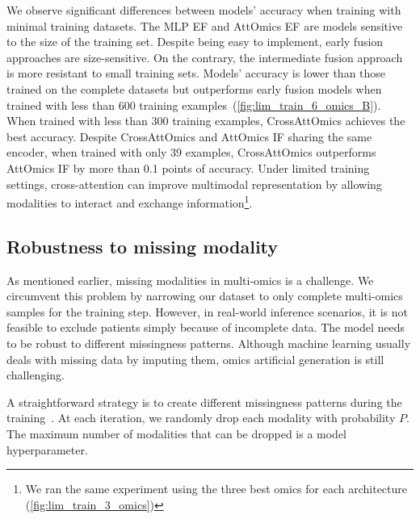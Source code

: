 \documentclass[../main.tex]{subfiles}
\begin{document}
	    We observe significant differences between models' accuracy when training with minimal training datasets.
	    The MLP EF and AttOmics EF are models sensitive to the size of the training set.
	    Despite being easy to implement, early fusion approaches are size-sensitive.
	    On the contrary, the intermediate fusion approach is more resistant to small training sets.
	    Models' accuracy is lower than those trained on the complete datasets but outperforms early fusion models when trained with less than 600 training examples~(\cref{fig:lim_train_6_omics_B}).
	    When trained with less than 300 training examples, CrossAttOmics achieves the best accuracy.
	    Despite CrossAttOmics and AttOmics IF sharing the same encoder, when trained with only 39 examples, CrossAttOmics outperforms AttOmics IF by more than 0.1 points of accuracy.
	    Under limited training settings, cross-attention can improve multimodal representation by allowing modalities to interact and exchange information\footnote{We ran the same experiment using the three best omics for each architecture (\cref{fig:lim_train_3_omics})}.

	\subsection{Robustness to missing modality}
	    As mentioned earlier, missing modalities in multi-omics is a challenge.
	    We circumvent this problem by narrowing our dataset to only complete multi-omics samples for the training step.
	    However, in real-world inference scenarios, it is not feasible to exclude patients simply because of incomplete data.
	    The model needs to be robust to different missingness patterns.
	    Although machine learning usually deals with missing data by imputing them, omics artificial generation is still challenging.

	    A straightforward strategy is to create different missingness patterns during the training~\cite{Cheerla2019}.
	    At each iteration, we randomly drop each modality with probability \(P\).
	    The maximum number of modalities that can be dropped is a model hyperparameter.\pagebreak
\end{document}
